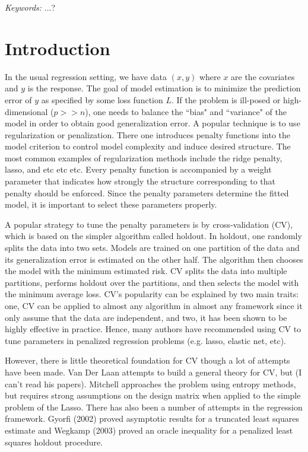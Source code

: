 \documentclass[12pt]{article}
\begin{document}
\noindent%
{\it Keywords:}  ...?
\vfill

\newpage
{} %
\section{Introduction}

In the usual regression setting, we have data $(x,y)$ where $x$ are the covariates and $y$ is the response. The goal of model estimation is to minimize the prediction error of $y$ as specified by some loss function $L$. If the problem is ill-posed or high-dimensional ($p >> n$), one needs to balance the ``bias" and ``variance" of the model in order to obtain good generalization error. A popular technique is to use regularization or penalization. There one introduces penalty functions into the model criterion to control model complexity and induce desired structure. The most common examples of regularization methods include the ridge penalty, lasso, and etc etc etc. Every penalty function is accompanied by a weight parameter that indicates how strongly the structure corresponding to that penalty should be enforced. Since the penalty parameters determine the fitted model, it is important to select these parameters properly.

A popular strategy to tune the penalty parameters is by cross-validation (CV), which is based on the simpler algorithm called holdout. In holdout, one randomly splits the data into two sets. Models are trained on one partition of the data and its generalization error is estimated on the other half. The algorithm then chooses the model with the minimum estimated risk. CV splits the data into multiple partitions, performs holdout over the partitions, and then selects the model with the minimum average loss. CV's popularity can be explained by two main traits: one, CV can be applied to almost any algorithm in almost any framework since it only assume that the data are independent, and two, it has been shown to be highly effective in practice. Hence, many authors have recommended using CV to tune parameters in penalized regression problems (e.g. lasso, elastic net, etc).

However, there is little theoretical foundation for CV though a lot of attempts have been made. Van Der Laan attempts to build a general theory for CV, but (I can't read his papers). Mitchell approaches the problem using entropy methods, but requires strong assumptions on the design matrix when applied to the simple problem of the Lasso. There has also been a number of attempts in the regression framework. Gyorfi (2002) proved asymptotic results for a truncated least squares estimate and Wegkamp (2003) proved an oracle inequality for a penalized least squares holdout procedure. 
\end{document}
